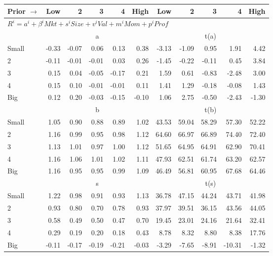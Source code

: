 
\begin{tabular}{lrrrrrrrrrr}
  \toprule
    
    Prior $\rightarrow$ & Low & 2 & 3 & 4 & High & Low & 2 & 3 & 4 & High  \\ 
  \midrule
  \multicolumn{11}{l}{$R^i=a^i+\beta^iMkt+s^iSize+v^iVal+m^iMom+p^iProf$}  \\
  
     & \multicolumn{5}{c}{a} & \multicolumn{5}{c}{t(a)}   \\
     \cmidrule(r){2-6} \cmidrule(r){7-11} 
    Small  & -0.33  & -0.07  & 0.06  & 0.13  & 0.38  & -3.13  & -1.09  & 0.95  & 1.91  & 4.42   \\
    2  & -0.11  & -0.01  & -0.01  & 0.03  & 0.26  & -1.45  & -0.22  & -0.11  & 0.45  & 3.84   \\
    3  & 0.15  & 0.04  & -0.05  & -0.17  & 0.21  & 1.59  & 0.61  & -0.83  & -2.48  & 3.00   \\
    4  & 0.15  & 0.10  & -0.01  & -0.01  & 0.11  & 1.41  & 1.29  & -0.18  & -0.08  & 1.43   \\
    Big  & 0.12  & 0.20  & -0.03  & -0.15  & -0.10  & 1.06  & 2.75  & -0.50  & -2.43  & -1.30   \\
    
  
     & \multicolumn{5}{c}{b} & \multicolumn{5}{c}{t(b)}   \\
     \cmidrule(r){2-6} \cmidrule(r){7-11} 
    Small  & 1.05  & 0.90  & 0.88  & 0.89  & 1.02  & 43.53  & 59.04  & 58.29  & 57.30  & 52.22   \\
    2  & 1.16  & 0.99  & 0.95  & 0.98  & 1.12  & 64.60  & 66.97  & 66.89  & 74.40  & 72.40   \\
    3  & 1.13  & 1.01  & 0.97  & 1.00  & 1.12  & 51.65  & 64.95  & 64.91  & 62.90  & 70.41   \\
    4  & 1.16  & 1.06  & 1.01  & 1.02  & 1.11  & 47.93  & 62.51  & 61.74  & 63.20  & 62.57   \\
    Big  & 1.16  & 0.95  & 0.95  & 0.99  & 1.09  & 46.49  & 56.81  & 60.95  & 67.68  & 64.46   \\
    
  
     & \multicolumn{5}{c}{s} & \multicolumn{5}{c}{t(s)}   \\
     \cmidrule(r){2-6} \cmidrule(r){7-11} 
    Small  & 1.22  & 0.98  & 0.91  & 0.93  & 1.13  & 36.78  & 47.15  & 44.24  & 43.71  & 41.98   \\
    2  & 0.93  & 0.80  & 0.70  & 0.78  & 0.93  & 37.97  & 39.51  & 36.15  & 43.56  & 44.05   \\
    3  & 0.58  & 0.49  & 0.50  & 0.47  & 0.70  & 19.45  & 23.01  & 24.16  & 21.64  & 32.41   \\
    4  & 0.29  & 0.19  & 0.20  & 0.18  & 0.43  & 8.78  & 8.32  & 8.80  & 8.38  & 17.76   \\
    Big  & -0.11  & -0.17  & -0.19  & -0.21  & -0.03  & -3.29  & -7.65  & -8.91  & -10.31  & -1.32   \\
    

\end{tabular}
